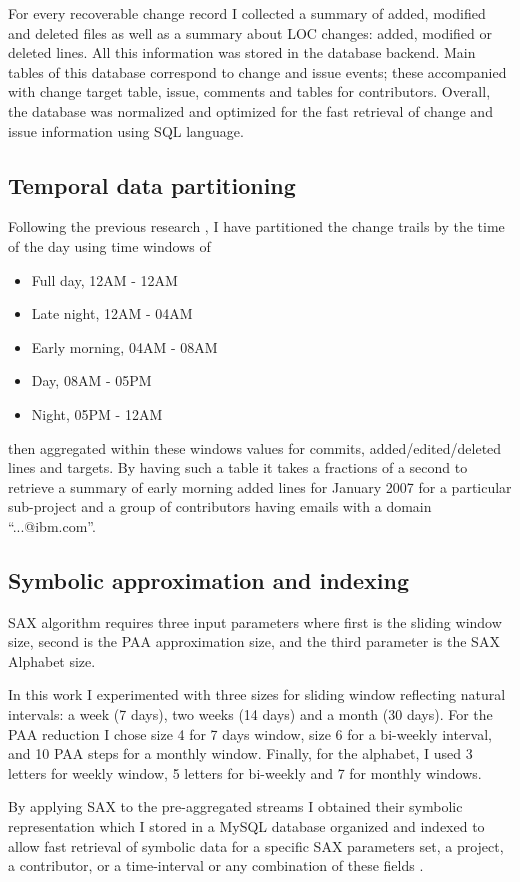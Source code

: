 \documentclass[10pt, conference, compsocconf]{IEEEtran}
\begin{document}
For every recoverable change record I collected a summary of added, modified and deleted files 
as well as a summary about LOC changes: added, modified or deleted lines. All this information 
was stored in the database backend. Main tables of this database correspond to change 
and issue events; these accompanied with change target table, issue, comments and 
tables for contributors. Overall, the database was normalized and optimized for the fast 
retrieval of change and issue information using SQL language.

\subsection{Temporal data partitioning}
Following the previous research \cite{citeulike:10392277}, I have partitioned the 
change trails by the time of the day using time windows of
\begin{itemize}
 \item Full day, 12AM - 12AM
    \item Late night, 12AM - 04AM  
    \item Early morning, 04AM - 08AM  
    \item Day, 08AM - 05PM  
    \item Night, 05PM - 12AM
\end{itemize}
then aggregated within these windows values for commits, added/edited/deleted 
lines and targets. By having such a table it takes a fractions of a second to retrieve 
a summary of early morning added lines for January 2007 for a particular sub-project and
a group of contributors having emails with a domain ``...@ibm.com''.

\subsection{Symbolic approximation and indexing}
SAX algorithm requires three input parameters where first is the sliding window size, 
second is the PAA approximation size, and the third parameter is the SAX Alphabet size.

In this work I experimented with three sizes for sliding window reflecting natural 
intervals: a week (7 days), two weeks (14 days) and a month (30 days).
For the PAA reduction I chose size 4 for 7 days window, size 6 for a bi-weekly interval,
and 10 PAA steps for a monthly window. Finally, for the alphabet, I used 3 letters for 
weekly window, 5 letters for bi-weekly and 7 for monthly windows.

By applying SAX to the pre-aggregated streams I obtained their symbolic representation
which I stored in a MySQL database organized and indexed to allow fast 
retrieval of symbolic data for a specific SAX parameters set, a project, a contributor, 
or a time-interval or any combination of these fields .
\end{document}
